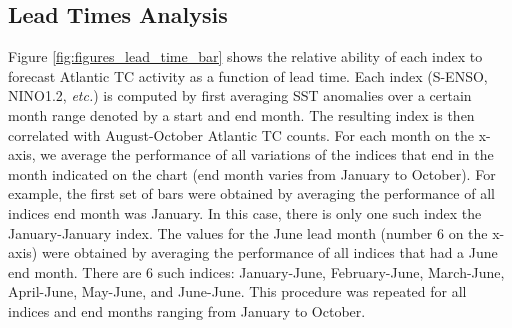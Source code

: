 \subsection{Lead Times Analysis}
Figure \ref{fig:figures_lead_time_bar} shows the relative ability of each index to forecast Atlantic TC activity as a function of lead time. Each index (S-ENSO, NINO1.2, \emph{etc.}) is computed by first averaging SST anomalies over a certain month range denoted by a start and end month. The resulting index is then correlated with August-October Atlantic TC counts. For each month on the x-axis, we average the performance of all variations of the indices that end in the month indicated on the chart (end month varies from January to October). 
For example, the first set of bars were obtained by averaging the performance of all indices end month was January. In this case, there is only one such index the January-January index. The values for the June lead month (number 6 on the x-axis) were obtained by averaging the performance of all indices that had a June end month. There are 6 such indices: January-June, February-June, March-June, April-June, May-June, and June-June. This procedure was repeated for all indices and end months ranging from January to October.



\newpage
